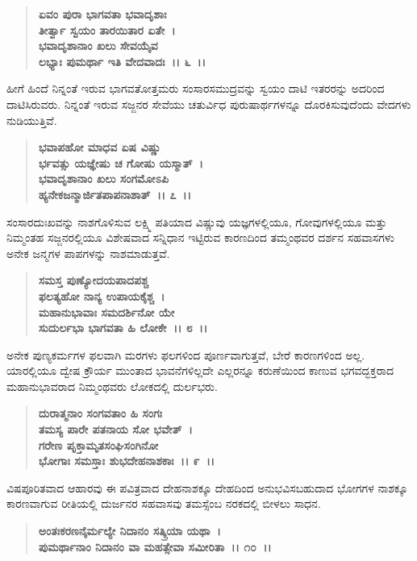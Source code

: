 \begin{verse}
\textbf{ಏವಂ ಪುರಾ ಭಾಗವತಾ ಭವಾದೃಶಾಃ} \\\textbf{ತೀರ್ತ್ವಾ ಸ್ವಯಂ ತಾರಯಿತಾರ ಏತೇ~।}\\\textbf{ಭವಾದೃಶಾನಾಂ ಖಲು ಸೇವಯೈವ} \\\textbf{ಲಭ್ಯಾಃ ಪುಮರ್ಥಾ ಇತಿ ವೇದವಾದಃ~।। ೬~।।}
\end{verse}

ಹೀಗೆ ಹಿಂದೆ ನಿನ್ನಂತೆ ಇರುವ ಭಾಗವತೋತ್ತಮರು ಸಂಸಾರಸಮುದ್ರವನ್ನು ಸ್ವಯಂ ದಾಟಿ ಇತರರನ್ನು ಅದರಿಂದ ದಾಟಿಸಿರುವರು. ನಿನ್ನಂತೆ ಇರುವ ಸಜ್ಜನರ ಸೇವೆಯು ಚತುರ್ವಿಧ ಪುರುಷಾರ್ಥಗಳನ್ನೂ ದೊರಕಿಸುವುದೆಂದು ವೇದಗಳು ನುಡಿಯುತ್ತಿವೆ.

\begin{verse}
\textbf{ಭವಾಪಹೋ ಮಾಧವ ಏಷ ವಿಷ್ಣು\enginline{-}} \\\textbf{ರ್ಭವತ್ಸು ಯಜ್ಞೇಷು ಚ ಗೋಷು ಯಸ್ಮಾತ್~।}\\\textbf{ಭವಾದೃಶಾನಾಂ ಖಲು ಸಂಗಮೋಽಪಿ} \\\textbf{ಹ್ಯನೇಕಜನ್ಮಾರ್ಜಿತಪಾಪನಾಶಾತ್~।। ೭~।।}
\end{verse}

ಸಂಸಾರದುಃಖವನ್ನು ನಾಶಗೊಳಿಸುವ ಲಕ್ಷ್ಮಿ ಪತಿಯಾದ ವಿಷ್ಣುವು ಯಜ್ಞಗಳಲ್ಲಿಯೂ, ಗೋವುಗಳಲ್ಲಿಯೂ ಮತ್ತು ನಿಮ್ಮಂತಹ ಸಜ್ಜನರಲ್ಲಿಯೂ ವಿಶೇಷವಾದ ಸನ್ನಿಧಾನ ಇಟ್ಟಿರುವ ಕಾರಣದಿಂದ ತಮ್ಮಂಥವರ ದರ್ಶನ ಸಹವಾಸಗಳು ಅನೇಕ ಜನ್ಮಗಳ ಪಾಪಗಳನ್ನು ನಾಶಮಾಡುತ್ತವೆ.

\begin{verse}
\textbf{ಸಮಸ್ತ ಪುಣ್ಯೋದಯಪಾದಪಶ್ಚ} \\\textbf{ಫಲತ್ಯಹೋ ನಾನ್ಯ ಉಪಾಯಕೈಶ್ಚ~।}\\\textbf{ಮಹಾನುಭಾವಾಃ ಸಮದರ್ಶಿನೋ ಯೇ} \\\textbf{ಸುದುರ್ಲಭಾ ಭಾಗವತಾ ಹಿ ಲೋಕೇ~।। ೮~।।}
\end{verse}

ಅನೇಕ ಪುಣ್ಯಕರ್ಮಗಳ ಫಲವಾಗಿ ಮರಗಳು ಫಲಗಳಿಂದ ಪೂರ್ಣವಾಗುತ್ತವೆ, ಬೇರೆ ಕಾರಣಗಳಿಂದ ಅಲ್ಲ. ಯಾರಲ್ಲಿಯೂ ದ್ವೇಷ ಕ್ರೌರ್ಯ ಮುಂತಾದ ಭಾವನೆಗಳಿಲ್ಲದೇ ಎಲ್ಲರನ್ನೂ ಕರುಣೆಯಿಂದ ಕಾಣುವ ಭಗವದ್ಭಕ್ತರಾದ ಮಹಾನುಭಾವರಾದ ನಿಮ್ಮಂಥವರು ಲೋಕದಲ್ಲಿ ದುರ್ಲಭರು.

\begin{verse}
\textbf{ದುರಾತ್ಮನಾಂ ಸಂಗವತಾಂ ಹಿ ಸಂಗಃ} \\\textbf{ತಮಸ್ಯ ಪಾರೇ ಪತನಾಯ ಸೋ ಭವೇತ್~।}\\\textbf{ಗರೇಣ ಪೃಕ್ತಾಮೃತಸಂಘಿಸಂಗಿನೋ} \\\textbf{ಭೋಗಾಃ ಸಮಸ್ತಾಃ ಶುಭದೇಹನಾಶಕಾಃ~।। ೯~।।}
\end{verse}

ವಿಷಪೂರಿತವಾದ ಆಹಾರವು ಈ ಪವಿತ್ರವಾದ ದೇಹನಾಶಕ್ಕೂ ದೇಹದಿಂದ ಅನುಭವಿಸಬಹುದಾದ ಭೋಗಗಳ ನಾಶಕ್ಕೂ ಕಾರಣವಾಗುವ ರೀತಿಯಲ್ಲಿ ದುರ್ಜನರ ಸಹವಾಸವು ತಮಸ್ಸೆಂಬ ನರಕದಲ್ಲಿ ಬೀಳಲು ಸಾಧನ.

\begin{verse}
\textbf{ಅಂತಃಕರಣನೈರ್ಮಲ್ಯೇ ನಿದಾನಂ ಸತ್ಕ್ರಿಯಾ ಯಥಾ~।}\\\textbf{ಪುಮರ್ಥಾನಾಂ ನಿದಾನಂ ವಾ ಮಹತ್ಸೇವಾ ಸಮೀರಿತಾ~।। ೧೦~।।}
\end{verse}

